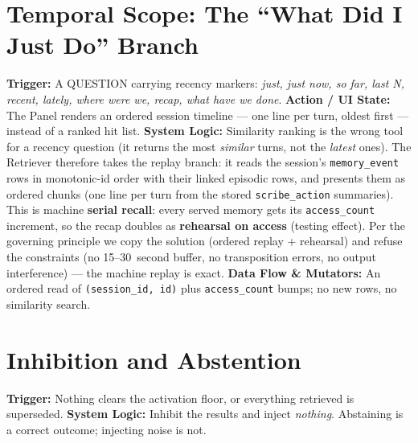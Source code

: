 \section{Temporal Scope: The ``What Did I Just Do'' Branch}
\textbf{Trigger:} A QUESTION carrying recency markers: \emph{just, just now, so far, last N,
recent, lately, where were we, recap, what have we done}.
\textbf{Action / UI State:} The Panel renders an ordered session timeline --- one line per turn,
oldest first --- instead of a ranked hit list.
\textbf{System Logic:} Similarity ranking is the wrong tool for a recency question (it returns
the most \emph{similar} turns, not the \emph{latest} ones). The Retriever therefore takes the
replay branch: it reads the session's \texttt{memory\_event} rows in monotonic-id order with
their linked episodic rows, and presents them as ordered chunks (one line per turn from the
stored \texttt{scribe\_action} summaries). This is machine \textbf{serial recall}: every served
memory gets its \texttt{access\_count} increment, so the recap doubles as \textbf{rehearsal on
access} (testing effect). Per the governing principle we copy the solution (ordered replay +
rehearsal) and refuse the constraints (no 15--30~second buffer, no transposition errors, no
output interference) --- the machine replay is exact.
\textbf{Data Flow \& Mutators:} An ordered read of \texttt{(session\_id, id)} plus
\texttt{access\_count} bumps; no new rows, no similarity search.

\section{Inhibition and Abstention}
\textbf{Trigger:} Nothing clears the activation floor, or everything retrieved is superseded.
\textbf{System Logic:} Inhibit the results and inject \emph{nothing}. Abstaining is a correct outcome;
injecting noise is not.
